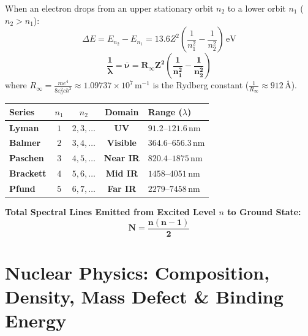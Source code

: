 \documentclass[10pt,twoside,openright]{book}
\begin{document}
\begin{formulabox}
When an electron drops from an upper stationary orbit $n_2$ to a lower orbit $n_1$ ($n_2 > n_1$):
\begin{equation}
  \Delta E = E_{n_2} - E_{n_1} = 13.6 Z^2 \left(\frac{1}{n_1^2} - \frac{1}{n_2^2}\right)\,\mathrm{eV}
\end{equation}
\begin{equation}
  \mathbf{\frac{1}{\lambda} = \overline{\nu} = R_\infty Z^2 \left(\frac{1}{n_1^2} - \frac{1}{n_2^2}\right)}
\end{equation}
where $R_\infty = \frac{m e^4}{8\varepsilon_0^2 c h^3} \approx 1.09737 \times 10^7\,\mathrm{m}^{-1}$ is the Rydberg constant ($\frac{1}{R_\infty} \approx 912\,\text{\AA}$).
\begin{center}
\footnotesize
\setlength{\tabcolsep}{3pt}
\begin{tabularx}{\linewidth}{|l|c|c|c|Y|}
\hline
\textbf{Series} & $n_1$ & $n_2$ & \textbf{Domain} & \textbf{Range ($\lambda$)} \\
\hline
\textbf{Lyman} & $1$ & $2, 3, \dots$ & \textbf{UV} & $91.2\text{--}121.6\,\mathrm{nm}$ \\
\hline
\textbf{Balmer} & $2$ & $3, 4, \dots$ & \textbf{Visible} & $364.6\text{--}656.3\,\mathrm{nm}$ \\
\hline
\textbf{Paschen} & $3$ & $4, 5, \dots$ & \textbf{Near IR} & $820.4\text{--}1875\,\mathrm{nm}$ \\
\hline
\textbf{Brackett} & $4$ & $5, 6, \dots$ & \textbf{Mid IR} & $1458\text{--}4051\,\mathrm{nm}$ \\
\hline
\textbf{Pfund} & $5$ & $6, 7, \dots$ & \textbf{Far IR} & $2279\text{--}7458\,\mathrm{nm}$ \\
\hline
\end{tabularx}
\end{center}
\textbf{Total Spectral Lines Emitted from Excited Level $n$ to Ground State:}
\begin{equation}
  \mathbf{N = \frac{n(n - 1)}{2}}
\end{equation}
\end{formulabox}

\section{Nuclear Physics: Composition, Density, Mass Defect \& Binding Energy}
\end{document}
